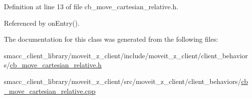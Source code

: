 Definition at line 13 of file cb\+\_\+move\+\_\+cartesian\+\_\+relative.\+h.



Referenced by on\+Entry().



The documentation for this class was generated from the following files\+:\begin{DoxyCompactItemize}
\item 
smacc\+\_\+client\+\_\+library/moveit\+\_\+z\+\_\+client/include/moveit\+\_\+z\+\_\+client/client\+\_\+behaviors/\hyperlink{cb__move__cartesian__relative_8h}{cb\+\_\+move\+\_\+cartesian\+\_\+relative.\+h}\item 
smacc\+\_\+client\+\_\+library/moveit\+\_\+z\+\_\+client/src/moveit\+\_\+z\+\_\+client/client\+\_\+behaviors/\hyperlink{cb__move__cartesian__relative_8cpp}{cb\+\_\+move\+\_\+cartesian\+\_\+relative.\+cpp}\end{DoxyCompactItemize}
